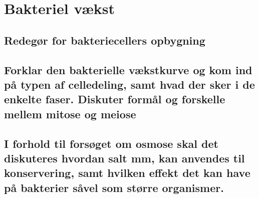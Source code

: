 \newpage
\section{Bakteriel vækst}
\subsection{Redegør for bakteriecellers opbygning}
\subsection{Forklar den bakterielle vækstkurve og kom ind på typen af celledeling, samt hvad der sker i de enkelte faser. Diskuter formål og forskelle mellem mitose og meiose}
\subsection{I forhold til forsøget om osmose skal det diskuteres hvordan salt mm, kan anvendes til konservering, samt hvilken effekt det kan have på bakterier såvel som større organismer.}